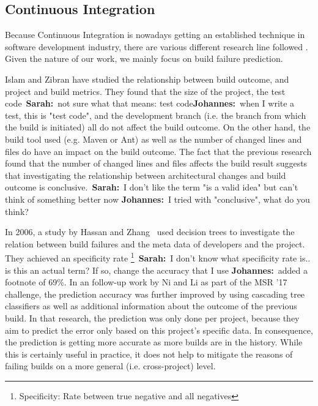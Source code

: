 \documentclass[sigplan, anonymous, review]{acmart}
\newcommand{\sn}[1]{{\color{blue}\textbf{Sarah:}~#1}}
\newcommand{\jk}[1]{{\color{violet}\textbf{Johannes:}~#1}}
\begin{document}
\subsection{Continuous Integration}

Because Continuous Integration is nowadays getting an established technique in software development industry, there are various different research line followed \cite{ci1, ci2, ci3, ci4}. Given the nature of our work, we mainly focus on build failure prediction.

Islam and Zibran \cite{FailsCorr} have studied the relationship between build outcome, and project and build metrics. 
They found that the size of the project, the test code~\sn{not sure what that means: test code}\jk{when I write a test, this is "test code"}, and the development branch (i.e. the branch from which the build is initiated) all do not affect the build outcome.
On the other hand, the build tool used (e.g. Maven or Ant) as well as the number of changed lines and files do have an impact on the build outcome.
The fact that the previous research found that the number of changed lines and files affects the build result suggests that investigating the relationship between architectural changes and build outcome is conclusive.~\sn{I don't like the term "is a valid idea" but can't think of something better now} \jk{I tried with "conclusive", what do you think?}

In 2006, a study by Hassan and Zhang~\cite{Pred-Tree} used decision trees to investigate the relation between build failures and the meta data of developers and the project.
They achieved an specificity rate \footnote{Specificity: Rate between true negative and all negatives}~\sn{I don't know what specificity rate is.. is this an actual term? If so, change the accuracy that I use} \jk{added a footnote} of 69\%.
In an follow-up work by Ni and Li as part of the MSR '17 challenge, the prediction accuracy was further improved by using cascading tree classifiers as well as additional information about the outcome of the previous build\cite{Pred-Cascade}. 
In that research, the prediction was only done per project, because they aim to predict the error only based on this project's specific data. In consequence, the prediction is getting more accurate as more builds are in the history.
While this is certainly useful in practice, it does not help to mitigate the reasons of failing builds on a more general (i.e. cross-project) level.
\end{document}

